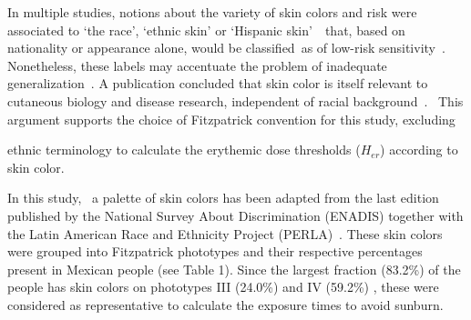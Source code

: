 \documentclass{article}
\begin{document}
{In multiple studies, notions about the variety of skin colors and risk
were associated to `the race', `ethnic skin' or `Hispanic
skin'~}\cite{2005,Rouhani_2008,Robinson_2017}{~that, based on nationality or appearance
alone, would be classified~as of low-risk
sensitivity~}\cite{Wolbarsht1999,Lancer1998,Del_Bino_2013}{. Nonetheless, these labels may
accentuate the problem of inadequate
generalization~}\cite{Cuevas_2016,Marcheco_Teruel_2014}{. A publication concluded that skin
color is itself relevant to cutaneous biology and disease research,
independent of racial background~}\cite{Torres_2017}{.~ This argument
supports the choice of Fitzpatrick convention for this study,
excluding}\textbf{~}{ethnic terminology to calculate the erythemic dose
thresholds (\(H_{er}\)) according to skin color.~

In this study,~ a palette of skin colors has been adapted from the last
edition published by the National Survey About Discrimination (ENADIS)
together with the Latin American Race and Ethnicity Project
(PERLA)~\cite{conacyt2010}. These skin colors were grouped into
Fitzpatrick phototypes and their respective percentages present in
Mexican people (see Table 1). Since the largest fraction (83.2\%) of the
people has skin colors on phototypes III (24.0\%) and IV (59.2\%) ,
these were considered as representative to calculate the exposure times
to avoid sunburn.~
}
\end{document}
